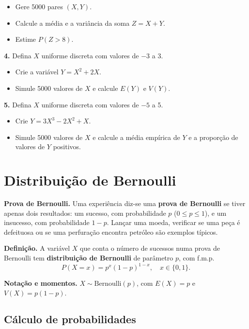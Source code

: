 \documentclass[
  portuguese,
  11pt,
  openany]{book}
\providecommand{\tightlist}{%
  \setlength{\itemsep}{0pt}\setlength{\parskip}{0pt}}
\begin{document}
\begin{itemize}
\tightlist
\item
  Gere 5000 pares \((X, Y)\).
\item
  Calcule a média e a variância da soma \(Z = X + Y\).
\item
  Estime \(P(Z > 8)\).
\end{itemize}

\textbf{4.} Defina \(X\) uniforme discreta com valores de \(-3\) a 3.

\begin{itemize}
\tightlist
\item
  Crie a variável \(Y = X^2 + 2X\).
\item
  Simule 5000 valores de \(X\) e calcule \(E(Y)\) e \(V(Y)\).
\end{itemize}

\textbf{5.} Defina \(X\) uniforme discreta com valores de \(-5\) a 5.

\begin{itemize}
\tightlist
\item
  Crie \(Y = 3X^3 - 2X^2 + X\).
\item
  Simule 5000 valores de \(X\) e calcule a média empírica de \(Y\) e a proporção de valores
  de \(Y\) positivos.
\end{itemize}

\section{Distribuição de Bernoulli}\label{distribuiuxe7uxe3o-de-bernoulli}

\textbf{Prova de Bernoulli.} Uma experiência diz-se uma \textbf{prova de Bernoulli} se tiver
apenas dois resultados: um sucesso, com probabilidade \(p\) (\(0 \leq p \leq 1\)), e um
insucesso, com probabilidade \(1 - p\). Lançar uma moeda, verificar se uma peça é
defeituosa ou se uma perfuração encontra petróleo são exemplos típicos.

\textbf{Definição.} A variável \(X\) que conta o número de sucessos numa prova de Bernoulli
tem \textbf{distribuição de Bernoulli} de parâmetro \(p\), com f.m.p.
\[P(X = x) = p^x (1-p)^{1-x}, \quad x \in \{0, 1\}.\]

\textbf{Notação e momentos.} \(X \sim \text{Bernoulli}(p)\), com \(E(X) = p\) e \(V(X) = p(1-p)\).

\subsection{Cálculo de probabilidades}\label{cuxe1lculo-de-probabilidades}
\end{document}
